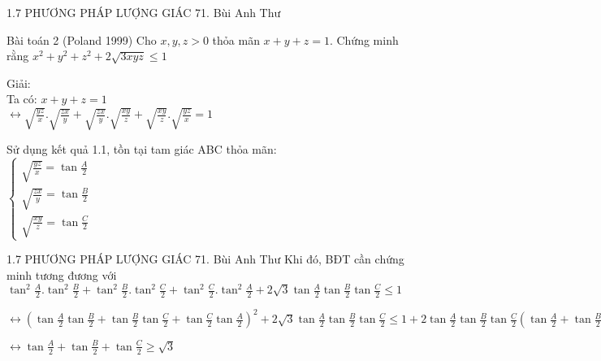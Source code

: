 \begin{frame}{1.7 PHƯƠNG PHÁP LƯỢNG GIÁC \hspace{3cm}  71. Bùi Anh Thư} 
\begin{block}{Bài toán 2 (Poland 1999)}
   Cho $x,y,z>0$ thỏa mãn $x+y+z=1$. Chứng minh rằng $x^2+y^2+z^2+2\sqrt{3xyz}\leq 1$\\
   \end{block}
   \pause
   \vspace{0,2cm}
   
   Giải:\\
   Ta có: $x+y+z=1$\\
   $\leftrightarrow \sqrt{\frac{yz}{x}}.\sqrt{\frac{zx}{y}}+\sqrt{\frac{zx}{y}}.\sqrt{\frac{xy}{z}}+\sqrt{\frac{xy}{z}}.\sqrt{\frac{yz}{x}}=1$\\
   \vspace{0,4cm}
   
   Sử dụng kết quả 1.1, tồn tại tam giác ABC thỏa mãn:\\
    $\left\{
    \begin{array}{ccc}
        \sqrt{\frac{yz}{x}}=\tan\frac{A}{2}\\
        \sqrt{\frac{zx}{y}}=\tan\frac{B}{2}\\
        \sqrt{\frac{xy}{z}}=\tan\frac{C}{2}
        
    \end{array}
    \right.$ 
\end{frame}

\begin{frame}{1.7 PHƯƠNG PHÁP LƯỢNG GIÁC \hspace{3cm}  71. Bùi Anh Thư} 
Khi đó, BĐT cần chứng minh tương đương với\\
$\tan^2\frac{A}{2}.\tan^2\frac{B}{2}+\tan^2\frac{B}{2}.\tan^2\frac{C}{2}+\tan^2\frac{C}{2}.\tan^2\frac{A}{2}+2\sqrt{3}\tan\frac{A}{2}\tan\frac{B}{2}\tan\frac{C}{2}\leq 1$\\
\vspace{0,4cm}

$\leftrightarrow (\tan\frac{A}{2}\tan\frac{B}{2}+\tan\frac{B}{2}\tan\frac{C}{2}+\tan\frac{C}{2}\tan\frac{A}{2})^2+2\sqrt{3}\tan\frac{A}{2}\tan\frac{B}{2}\tan\frac{C}{2}\leq 1+2\tan\frac{A}{2}\tan\frac{B}{2}\tan\frac{C}{2}(\tan\frac{A}{2}+\tan\frac{B}{2}+\tan\frac{C}{2})$\\
\vspace{0,4cm}

$\leftrightarrow \tan\frac{A}{2}+\tan\frac{B}{2}+\tan\frac{C}{2}\geq \sqrt{3}$\\

\end{frame}

